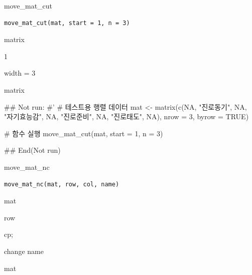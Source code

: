 \documentclass[a4paper]{book}
\begin{document}
%
\begin{Description}
move\_mat\_cut
\end{Description}
%
\begin{Usage}
\begin{verbatim}
move_mat_cut(mat, start = 1, n = 3)
\end{verbatim}
\end{Usage}
%
\begin{Arguments}
\begin{ldescription}
\item[\code{mat}] matrix

\item[\code{start}] 1

\item[\code{n}] width = 3
\end{ldescription}
\end{Arguments}
%
\begin{Value}
matrix
\end{Value}
%
\begin{Examples}
\begin{ExampleCode}

\#\# Not run: 
#'
# 테스트용 행렬 데이터
mat <- matrix(c(NA, "진로동기", NA, "자기효능감", NA,
    "진로준비", NA, "진로태도", NA), nrow = 3, byrow = TRUE)

# 함수 실행
move_mat_cut(mat, start = 1, n = 3)


## End(Not run)


\end{ExampleCode}
\end{Examples}

%
\begin{Description}
move\_mat\_nc
\end{Description}
%
\begin{Usage}
\begin{verbatim}
move_mat_nc(mat, row, col, name)
\end{verbatim}
\end{Usage}
%
\begin{Arguments}
\begin{ldescription}
\item[\code{mat}] mat

\item[\code{row}] row

\item[\code{col}] cp;

\item[\code{name}] change name
\end{ldescription}
\end{Arguments}
%
\begin{Value}
mat
\end{Value}
\end{document}
